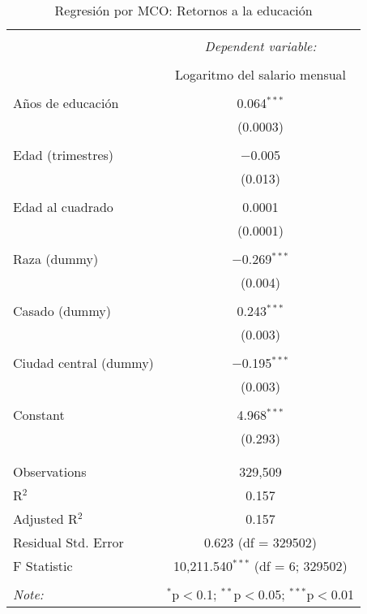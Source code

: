 
\begin{table}[!htbp] \centering 
  \caption{Regresión por MCO: Retornos a la educación} 
  \label{} 
\begin{tabular}{@{\extracolsep{5pt}}lc} 
\\[-1.8ex]\hline 
\hline \\[-1.8ex] 
 & \multicolumn{1}{c}{\textit{Dependent variable:}} \\ 
\cline{2-2} 
\\[-1.8ex] & Logaritmo del salario mensual \\ 
\hline \\[-1.8ex] 
 Años de educación & 0.064$^{***}$ \\ 
  & (0.0003) \\ 
  & \\ 
 Edad (trimestres) & $-$0.005 \\ 
  & (0.013) \\ 
  & \\ 
 Edad al cuadrado & 0.0001 \\ 
  & (0.0001) \\ 
  & \\ 
 Raza (dummy) & $-$0.269$^{***}$ \\ 
  & (0.004) \\ 
  & \\ 
 Casado (dummy) & 0.243$^{***}$ \\ 
  & (0.003) \\ 
  & \\ 
 Ciudad central (dummy) & $-$0.195$^{***}$ \\ 
  & (0.003) \\ 
  & \\ 
 Constant & 4.968$^{***}$ \\ 
  & (0.293) \\ 
  & \\ 
\hline \\[-1.8ex] 
Observations & 329,509 \\ 
R$^{2}$ & 0.157 \\ 
Adjusted R$^{2}$ & 0.157 \\ 
Residual Std. Error & 0.623 (df = 329502) \\ 
F Statistic & 10,211.540$^{***}$ (df = 6; 329502) \\ 
\hline 
\hline \\[-1.8ex] 
\textit{Note:}  & \multicolumn{1}{r}{$^{*}$p$<$0.1; $^{**}$p$<$0.05; $^{***}$p$<$0.01} \\ 
\end{tabular} 
\end{table} 
